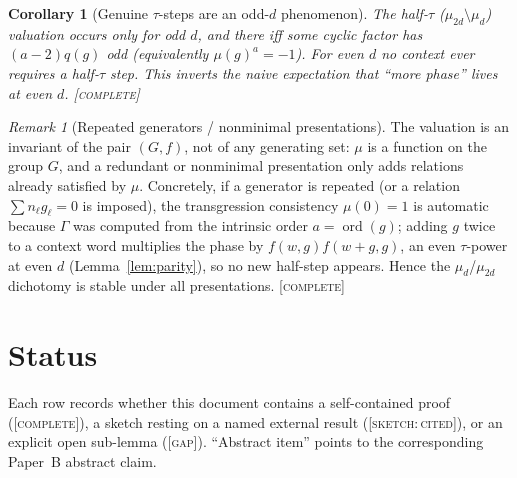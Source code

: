 \documentclass[11pt]{article}
\newtheorem{corollary}[theorem]{Corollary}
\theoremstyle{definition}
\theoremstyle{remark}
\newtheorem{remark}[theorem]{Remark}
\DeclareMathOperator{\ord}{ord}
\newcommand{\CO}{\textnormal{\textsc{[complete]}}}
\newcommand{\SK}{\textnormal{\textsc{[sketch:\,cited]}}}
\newcommand{\GAP}{\textnormal{\textsc{[gap]}}}
\begin{document}
\begin{corollary}[Genuine $\tau$-steps are an odd-$d$ phenomenon]\label{cor:oddphenom}
The half-$\tau$ ($\mu_{2d}\setminus\mu_d$) valuation occurs \emph{only} for odd $d$, and there iff
some cyclic factor has $(a-2)q(g)$ odd (equivalently $\mu(g)^a=-1$). For even $d$ no context ever
requires a half-$\tau$ step. This inverts the naive expectation that ``more phase'' lives at even
$d$. \CO
\end{corollary}

\begin{remark}[Repeated generators / nonminimal presentations]\label{rem:presentation}
The valuation is an invariant of the pair $(G,f)$, not of any generating set: $\mu$ is a function on
the group $G$, and a redundant or nonminimal presentation only adds relations already satisfied by
$\mu$. Concretely, if a generator is repeated (or a relation $\sum n_\ell g_\ell=0$ is imposed), the
transgression consistency $\mu(0)=1$ is automatic because $\Gamma$ was computed from the intrinsic
order $a=\ord(g)$; adding $g$ twice to a context word multiplies the phase by $f(w,g)f(w+g,g)$, an
even $\tau$-power at even $d$ (Lemma~\ref{lem:parity}), so no new half-step appears. Hence the
$\mu_d$/$\mu_{2d}$ dichotomy is stable under all presentations. \CO
\end{remark}

\section{Status}\label{sec:status}

Each row records whether this document contains a self-contained proof (\CO), a sketch resting on a
named external result (\SK), or an explicit open sub-lemma (\GAP). ``Abstract item'' points to the
corresponding Paper~B abstract claim.
\end{document}
